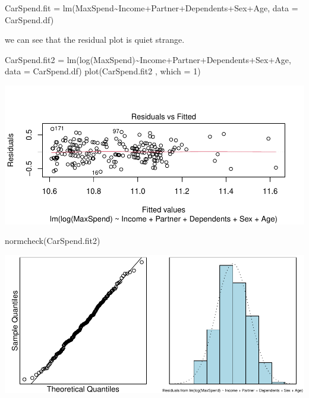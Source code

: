 \documentclass[
]{article}
\newenvironment{Shaded}{\begin{snugshade}}{\end{snugshade}}
\newcommand{\AttributeTok}[1]{\textcolor[rgb]{0.77,0.63,0.00}{#1}}
\newcommand{\DecValTok}[1]{\textcolor[rgb]{0.00,0.00,0.81}{#1}}
\newcommand{\FunctionTok}[1]{\textcolor[rgb]{0.00,0.00,0.00}{#1}}
\newcommand{\NormalTok}[1]{#1}
\newcommand{\OtherTok}[1]{\textcolor[rgb]{0.56,0.35,0.01}{#1}}
\newcommand{\SpecialCharTok}[1]{\textcolor[rgb]{0.00,0.00,0.00}{#1}}
\begin{document}
\begin{Shaded}
\begin{Highlighting}[]
\NormalTok{CarSpend.fit }\OtherTok{=} \FunctionTok{lm}\NormalTok{(MaxSpend}\SpecialCharTok{\textasciitilde{}}\NormalTok{Income}\SpecialCharTok{+}\NormalTok{Partner}\SpecialCharTok{+}\NormalTok{Dependents}\SpecialCharTok{+}\NormalTok{Sex}\SpecialCharTok{+}\NormalTok{Age, }\AttributeTok{data =}\NormalTok{ CarSpend.df)}
\end{Highlighting}
\end{Shaded}

we can see that the residual plot is quiet strange.

\begin{Shaded}
\begin{Highlighting}[]
\NormalTok{CarSpend.fit2 }\OtherTok{=} \FunctionTok{lm}\NormalTok{(}\FunctionTok{log}\NormalTok{(MaxSpend)}\SpecialCharTok{\textasciitilde{}}\NormalTok{Income}\SpecialCharTok{+}\NormalTok{Partner}\SpecialCharTok{+}\NormalTok{Dependents}\SpecialCharTok{+}\NormalTok{Sex}\SpecialCharTok{+}\NormalTok{Age, }\AttributeTok{data =}\NormalTok{ CarSpend.df)}
\FunctionTok{plot}\NormalTok{(CarSpend.fit2 , }\AttributeTok{which =} \DecValTok{1}\NormalTok{)}
\end{Highlighting}
\end{Shaded}

\includegraphics{STATS201_2022_SWU_A3_files/figure-latex/unnamed-chunk-4-1.pdf}

\begin{Shaded}
\begin{Highlighting}[]
\FunctionTok{normcheck}\NormalTok{(CarSpend.fit2)}
\end{Highlighting}
\end{Shaded}

\includegraphics{STATS201_2022_SWU_A3_files/figure-latex/unnamed-chunk-4-2.pdf}
\end{document}
